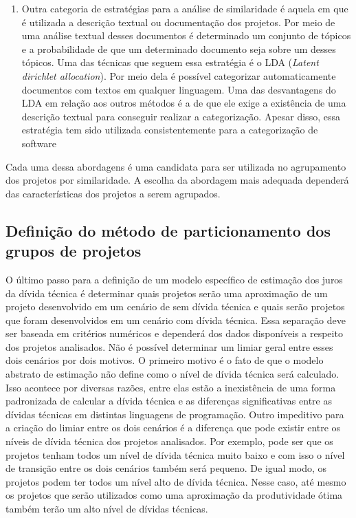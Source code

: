 \begin{enumerate}
\item Outra categoria de estratégias para a análise de similaridade é aquela em que é utilizada a descrição textual ou documentação dos projetos. Por meio de uma análise textual desses documentos é determinado um conjunto de tópicos e a probabilidade de que um determinado documento seja sobre um desses tópicos. Uma das técnicas que seguem essa estratégia é o LDA (\textit{Latent dirichlet allocation})\cite{blei2002latent}. Por meio dela é possível categorizar automaticamente documentos com textos em qualquer linguagem. Uma das desvantagens do LDA em relação aos outros métodos é a de que ele exige a existência de uma descrição textual para conseguir realizar a categorização. Apesar disso, essa estratégia tem sido utilizada consistentemente para a categorização de software\cite{chen2012explaining,tian2009using,maskeri2008mining,kelly2011recovering} 

 \end{enumerate}
 
 Cada uma dessa abordagens é uma candidata para ser utilizada no agrupamento dos projetos por similaridade. A escolha da abordagem mais adequada dependerá das características dos projetos a serem agrupados. 



\subsection{Definição do método de particionamento dos grupos de projetos}


 O último passo para a definição de um modelo específico de estimação dos juros da dívida técnica é determinar quais projetos serão uma aproximação de um projeto desenvolvido em um cenário de sem dívida técnica e quais serão projetos que foram desenvolvidos em um cenário com dívida técnica. Essa separação deve ser baseada em critérios numéricos e dependerá dos dados disponíveis a respeito dos projetos analisados.  Não é possível determinar um limiar geral entre esses dois cenários por dois motivos. O primeiro motivo é o fato de que o modelo abstrato de estimação não define como o nível de dívida técnica será calculado. Isso acontece por diversas razões, entre elas estão a inexistência de uma forma padronizada de calcular a dívida técnica e as diferenças significativas entre as dívidas técnicas em distintas linguagens de programação. Outro impeditivo para a criação do limiar entre os dois cenários é a diferença que pode existir entre os níveis de dívida técnica dos projetos analisados. Por exemplo, pode ser que os projetos tenham todos um nível de dívida técnica muito baixo e com isso o nível de transição entre os dois cenários também será pequeno. De igual modo, os projetos podem ter todos um nível alto de dívida técnica. Nesse caso, até mesmo os projetos que serão utilizados como uma aproximação da produtividade ótima também terão um alto nível de dívidas técnicas.
 
